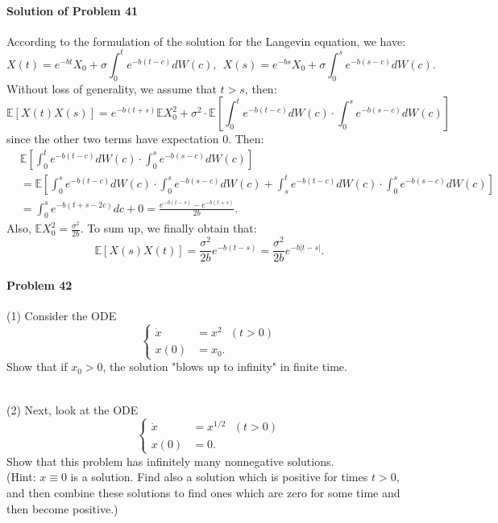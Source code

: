 \documentclass{article}
\begin{document}
\paragraph{Solution of Problem 41} According to the formulation of the solution for the Langevin equation, we have:
\[X(t) = e^{-bt}X_0+\sigma\int_0^t e^{-b(t-c)}dW(c),~~X(s) = e^{-bs}X_0+\sigma\int_0^s e^{-b(s-c)}dW(c).\]
Without loss of generality, we assume that $t>s$, then:
\[\mathbb{E}[X(t)X(s)]=e^{-b(t+s)}\mathbb{E}X_0^2 + \sigma^2\cdot\mathbb{E}\left[\int_0^t e^{-b(t-c)}dW(c)\cdot \int_0^s e^{-b(s-c)}dW(c)\right]\]
since the other two terms have expectation 0. Then:
\begin{equation*}
\begin{aligned}
&\mathbb{E}\left[\int_0^t e^{-b(t-c)}dW(c)\cdot \int_0^s e^{-b(s-c)}dW(c)\right] \\
&= \mathbb{E} \left[\int_0^s e^{-b(t-c)}dW(c)\cdot \int_0^s e^{-b(s-c)}dW(c) + \int_s^t e^{-b(t-c)}dW(c)\cdot \int_0^s e^{-b(s-c)}dW(c)\right]\\
&= \int_0^s e^{-b(t+s-2c)}dc + 0 = \frac{e^{-b(t-s)}-e^{-b(t+s)}}{2b}.
\end{aligned}    
\end{equation*}
Also, $\mathbb{E}X_0^2 = \frac{\sigma^2}{2b}$. To sum up, we finally obtain that:
\[\mathbb{E}[X(s)X(t)]= \frac{\sigma^2}{2b}e^{-b(t-s)}= \frac{\sigma^2}{2b}e^{-b|t-s|}.\]



\paragraph{Problem 42} (1) Consider the ODE
\begin{equation*}
\begin{cases}
\dot{x} &= x^2~~~(t>0)\\
x(0) &= x_0.
\end{cases}    
\end{equation*}
Show that if $x_0 > 0$, the solution "blows up to infinity" in finite time.

~\\
(2) Next, look at the ODE
\begin{equation*}
\begin{cases}
\dot{x} &= x^{1/2}~~~(t>0)\\
x(0) &= 0.
\end{cases}    
\end{equation*}
Show that this problem has infinitely many nonnegative solutions. \\
(Hint: $x\equiv 0$ is a solution. Find also a solution which is positive for times $t>0$, and then combine these solutions to find ones which are zero for some time and then become positive.)
\end{document}
